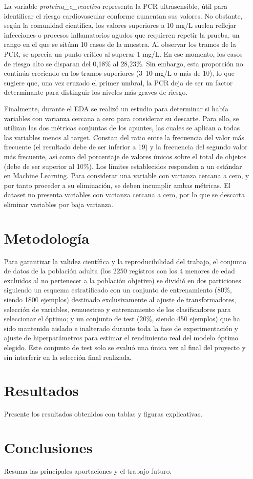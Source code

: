 \documentclass[journal,onecolumn]{IEEEtran}
\begin{document}
La variable \textit{proteina\_c\_reactiva} representa la PCR ultrasensible, útil para identificar el riesgo cardiovascular conforme aumentan sus valores. No obstante, según la comunidad científica, los valores superiores a 10 mg/L suelen reflejar infecciones o procesos inflamatorios agudos que requieren repetir la prueba, un rango en el que se sitúan 10 casos de la muestra. Al observar los tramos de la PCR, se aprecia un punto crítico al superar 1 mg/L. En ese momento, los casos de riesgo alto se disparan del 0,18\% al 28,23\%. Sin embargo, esta proporción no continúa creciendo en los tramos superiores (3–10 mg/L o más de 10), lo que sugiere que, una vez cruzado el primer umbral, la PCR deja de ser un factor determinante para distinguir los niveles más graves de riesgo.

Finalmente, durante el EDA se realizó un estudio para determinar si había variables con varianza cercana a cero para considerar su descarte. Para ello, se utilizan las dos métricas conjuntas de los apuntes, las cuales se aplican a todas las variables menos al target. Constan del ratio entre la frecuencia del valor más frecuente (el resultado debe de ser inferior a 19) y la frecuencia del segundo valor más frecuente, así como del porcentaje de valores únicos sobre el total de objetos (debe de ser superior al 10\%). Los límites establecidos responden a un estándar en Machine Learning. Para considerar una variable con varianza cercana a cero, y por tanto proceder a su eliminación, se deben incumplir ambas métricas. El dataset no presenta variables con varianza cercana a cero, por lo que se descarta eliminar variables por baja varianza.

\section{Metodología}

Para garantizar la validez científica y la reproducibilidad del trabajo, el conjunto de datos de la población adulta (los 2250 registros con los 4 menores de edad excluidos al no pertenecer a la población objetivo) se dividió en dos particiones siguiendo un esquema estratificado con un conjunto de entrenamiento (80\%, siendo 1800 ejemplos) destinado exclusivamente al ajuste de transformadores, selección de variables, remuestreo y entrenamiento de los clasificadores para seleccionar el óptimo; y un conjunto de test (20\%, siendo 450 ejemplos) que ha sido mantenido aislado e inalterado durante toda la fase de experimentación y ajuste de hiperparámetros para estimar el rendimiento real del modelo óptimo elegido. Este conjunto de test solo se evaluó una única vez al final del proyecto y sin interferir en la selección final realizada.

\section{Resultados}
Presente los resultados obtenidos con tablas y figuras explicativas.

\section{Conclusiones}
Resuma las principales aportaciones y el trabajo futuro.



\end{document}
